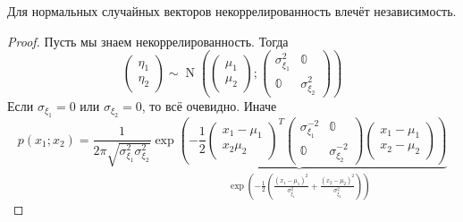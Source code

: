\documentclass{article}
\begin{document}
    \begin{claim}
        Для нормальных случайных векторов некоррелированность влечёт независимость.
    \end{claim}
    \begin{proof}
        Пусть мы знаем некоррелированность. Тогда
        $$\left(\begin{matrix}
            \eta_1\\\eta_2
        \end{matrix}\right)\sim\operatorname{N}(\left(\begin{matrix}
            \mu_1\\\mu_2
        \end{matrix}\right);\left(\begin{matrix}
            \sigma_{\xi_1}^2 & \mathbb0\\\mathbb0 & \sigma_{\xi_2}^2
        \end{matrix}\right))
        $$
        Если $\sigma_{\xi_1}=0$ или $\sigma_{\xi_2}=0$, то всё очевидно. Иначе
        $$
        p(x_1;x_2)=\frac1{2\pi\sqrt{\sigma_{\xi_1}^2\sigma_{\xi_2}^2}}\underbrace{\exp\left(-\frac12\left(\begin{matrix}
            x_1-\mu_1\\x_2\mu_2
        \end{matrix}\right)^T
        \left(\begin{matrix}
            \sigma_{\xi_1}^{-2} & \mathbb0\\\mathbb0 & \sigma_{\xi_2}^{-2}
        \end{matrix}\right)
        \left(\begin{matrix}
            x_1-\mu_1\\x_2-\mu_2
        \end{matrix}\right)\right)}_{\exp\left(-\frac12\left(\frac{(x_1-\mu_1)^2}{\sigma_{\xi_1}^2}+\frac{(x_2-\mu_2)^2}{\sigma_{\xi_2}^2}\right)\right)}
        $$
    \end{proof}
\end{document}
